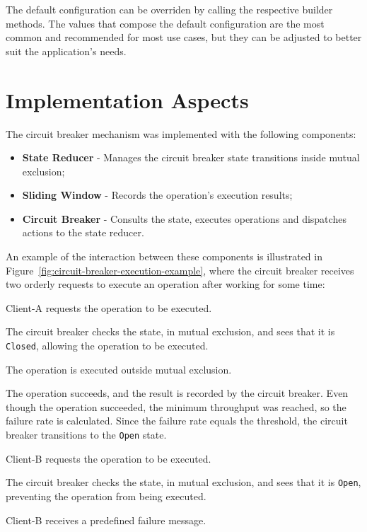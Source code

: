 The default configuration can be overriden by calling the respective builder methods.
The values that compose the default configuration are the most common and recommended for most use cases, but they can be adjusted to better suit the application's needs.


\section{Implementation Aspects}\label{sec:cbreaker-implementation-aspects}

The circuit breaker mechanism was implemented with the following components:

\begin{itemize}
    \item \textbf{State Reducer} - Manages the circuit breaker state transitions inside mutual exclusion;
    \item \textbf{Sliding Window} - Records the operation's execution results;
    \item \textbf{Circuit Breaker} - Consults the state, executes operations and dispatches actions to the state reducer.
\end{itemize}

An example of the interaction between these components is illustrated in Figure~\ref{fig:circuit-breaker-execution-example},
where the circuit breaker receives two orderly requests to execute an operation after working for some time:

\begin{boldenumerate}
    \item Client-A requests the operation to be executed.
    \item The circuit breaker checks the state, in mutual exclusion, and sees that it is \texttt{Closed}, allowing the operation to be executed.
    \item The operation is executed outside mutual exclusion.
    \item The operation succeeds, and the result is recorded by the circuit breaker.
    Even though the operation succeeded, the minimum throughput was reached, so the failure rate is calculated.
    Since the failure rate equals the threshold, the circuit breaker transitions to the \texttt{Open} state.
    \item Client-B requests the operation to be executed.
    \item The circuit breaker checks the state, in mutual exclusion, and sees that it is \texttt{Open}, preventing the operation from being executed.
    \item Client-B receives a predefined failure message.
\end{boldenumerate}

